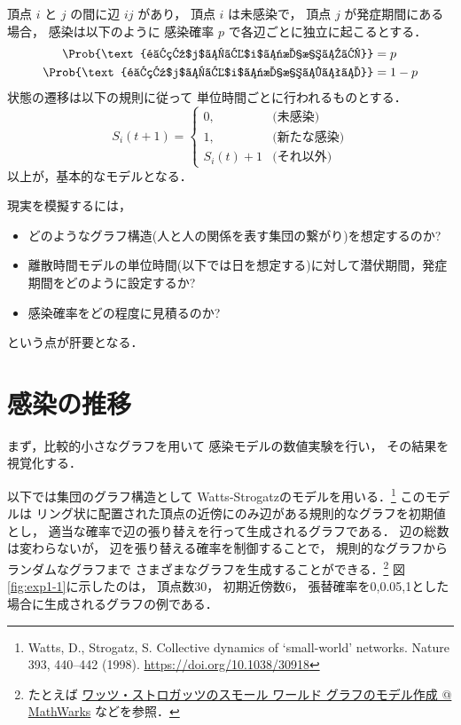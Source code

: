 \documentclass[10pt,oneside]{scrartcl}
\begin{document}
頂点 \(i\) と \(j\) の間に辺 \(ij\) があり，
頂点 \(i\) は未感染で，
頂点 \(j\) が発症期間にある場合，
感染は以下のように
感染確率 \(p\) で各辺ごとに独立に起こるとする．
\begin{align}
  \Prob{\text{頂点$j$から$i$に感染する}} &=p\\
  \Prob{\text{頂点$j$から$i$に感染しない}}&=1-p
\end{align}
状態の遷移は以下の規則に従って
単位時間ごとに行われるものとする．
\begin{equation}
  S_{i}(t+1)
  =
  \begin{cases}
    0,&\text{(未感染)}\\
    1,&\text{(新たな感染)}\\
    S_{i}(t)+1&\text{(それ以外)}
  \end{cases}
\end{equation}
以上が，基本的なモデルとなる．

現実を模擬するには，
\begin{itemize}
\item どのようなグラフ構造(人と人の関係を表す集団の繋がり)を想定するのか?
\item 離散時間モデルの単位時間(以下では日を想定する)に対して潜伏期間，発症期間をどのように設定するか?
\item 感染確率をどの程度に見積るのか?
\end{itemize}
という点が肝要となる．

\section{感染の推移}
\label{sec:orgac0e107}

まず，比較的小さなグラフを用いて
感染モデルの数値実験を行い，
その結果を視覚化する．

以下では集団のグラフ構造として
Watts-Strogatzのモデルを用いる．\footnote{Watts, D., Strogatz, S. Collective dynamics of ‘small-world’ networks. Nature 393, 440–442 (1998). \url{https://doi.org/10.1038/30918}}
このモデルは
リング状に配置された頂点の近傍にのみ辺がある規則的なグラフを初期値とし，
適当な確率で辺の張り替えを行って生成されるグラフである．
辺の総数は変わらないが，
辺を張り替える確率を制御することで，
規則的なグラフからランダムなグラフまで
さまざまなグラフを生成することができる．\footnote{たとえば \href{https://jp.mathworks.com/help/matlab/math/build-watts-strogatz-small-world-graph-model.html}{ワッツ・ストロガッツのスモール ワールド グラフのモデル作成 @ MathWarks} 
などを参照．}
図\ref{fig:exp1-1}に示したのは，
頂点数30，
初期近傍数6，
張替確率を0,0.05,1とした場合に生成されるグラフの例である．
\end{document}
